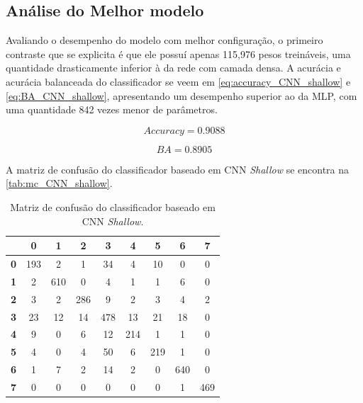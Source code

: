 \subsection{Análise do Melhor modelo}

	Avaliando o desempenho do modelo com melhor configuração, o primeiro contraste que se explicita é que ele possuí apenas 115,976 pesos treináveis, uma quantidade drasticamente inferior à da rede com camada densa. A acurácia e acurácia balanceada do classificador se veem em \eqref{eq:accuracy_CNN_shallow} e \eqref{eq:BA_CNN_shallow}, apresentando um desempenho superior ao da MLP, com uma quantidade 842 vezes menor de parâmetros.

\begin{equation}\label{eq:accuracy_CNN_shallow}
	Accuracy = 0.9088
\end{equation}

\begin{equation}\label{eq:BA_CNN_shallow}
	BA = 0.8905
\end{equation}

A matriz de confusão do classificador baseado em CNN \textit{Shallow} se encontra na \autoref{tab:mc_CNN_shallow}. 
\begin{table}[H]
	\centering
	\begin{tabular}{c||c|c|c|c|c|c|c|c|}
		\cline{2-9}
		\textbf{}                        & \textbf{0} & \textbf{1} & \textbf{2} & \textbf{3} & \textbf{4} & \textbf{5} & \textbf{6} & \textbf{7} \\ \hline \hline
		\multicolumn{1}{|c||}{\textbf{0}} & 193        & 2          & 1          & 34         & 4          & 10         & 0          & 0          \\ \hline
		\multicolumn{1}{|c||}{\textbf{1}} & 2          & 610        & 0          & 4          & 1          & 1          & 6          & 0          \\ \hline
		\multicolumn{1}{|c||}{\textbf{2}} & 3          & 2          & 286        & 9          & 2          & 3          & 4          & 2          \\ \hline
		\multicolumn{1}{|c||}{\textbf{3}} & 23         & 12         & 14         & 478        & 13         & 21         & 18         & 0          \\ \hline
		\multicolumn{1}{|c||}{\textbf{4}} & 9          & 0          & 6          & 12         & 214        & 1          & 1          & 0          \\ \hline
		\multicolumn{1}{|c||}{\textbf{5}} & 4          & 0          & 4          & 50         & 6          & 219        & 1          & 0          \\ \hline
		\multicolumn{1}{|c||}{\textbf{6}} & 1          & 7          & 2          & 14         & 2          & 0          & 640        & 0          \\ \hline
		\multicolumn{1}{|c||}{\textbf{7}} & 0          & 0          & 0          & 0          & 0          & 0          & 1          & 469        \\ \hline
	\end{tabular}
	\caption{Matriz de confusão do classificador baseado em CNN \textit{Shallow}.}
	\label{tab:mc_CNN_shallow}
\end{table}

